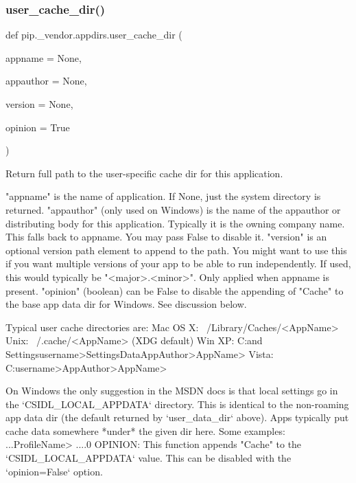 \subsubsection{\texorpdfstring{user\+\_\+cache\+\_\+dir()}{user\_cache\_dir()}}
{\footnotesize\ttfamily def pip.\+\_\+vendor.\+appdirs.\+user\+\_\+cache\+\_\+dir (\begin{DoxyParamCaption}\item[{}]{appname = {\ttfamily None},  }\item[{}]{appauthor = {\ttfamily None},  }\item[{}]{version = {\ttfamily None},  }\item[{}]{opinion = {\ttfamily True} }\end{DoxyParamCaption})}

\begin{DoxyVerb}Return full path to the user-specific cache dir for this application.

    "appname" is the name of application.
        If None, just the system directory is returned.
    "appauthor" (only used on Windows) is the name of the
        appauthor or distributing body for this application. Typically
        it is the owning company name. This falls back to appname. You may
        pass False to disable it.
    "version" is an optional version path element to append to the
        path. You might want to use this if you want multiple versions
        of your app to be able to run independently. If used, this
        would typically be "<major>.<minor>".
        Only applied when appname is present.
    "opinion" (boolean) can be False to disable the appending of
        "Cache" to the base app data dir for Windows. See
        discussion below.

Typical user cache directories are:
    Mac OS X:   ~/Library/Caches/<AppName>
    Unix:       ~/.cache/<AppName> (XDG default)
    Win XP:     C:\Documents and Settings\<username>\Local Settings\Application Data\<AppAuthor>\<AppName>\Cache
    Vista:      C:\Users\<username>\AppData\Local\<AppAuthor>\<AppName>\Cache

On Windows the only suggestion in the MSDN docs is that local settings go in
the `CSIDL_LOCAL_APPDATA` directory. This is identical to the non-roaming
app data dir (the default returned by `user_data_dir` above). Apps typically
put cache data somewhere *under* the given dir here. Some examples:
    ...\Mozilla\Firefox\Profiles\<ProfileName>\Cache
    ...\Acme\SuperApp\Cache\1.0
OPINION: This function appends "Cache" to the `CSIDL_LOCAL_APPDATA` value.
This can be disabled with the `opinion=False` option.
\end{DoxyVerb}
 \mbox{\label{namespacepip_1_1__vendor_1_1appdirs_ad0a8829c143ff53734b0b348b3f603dd}} 

